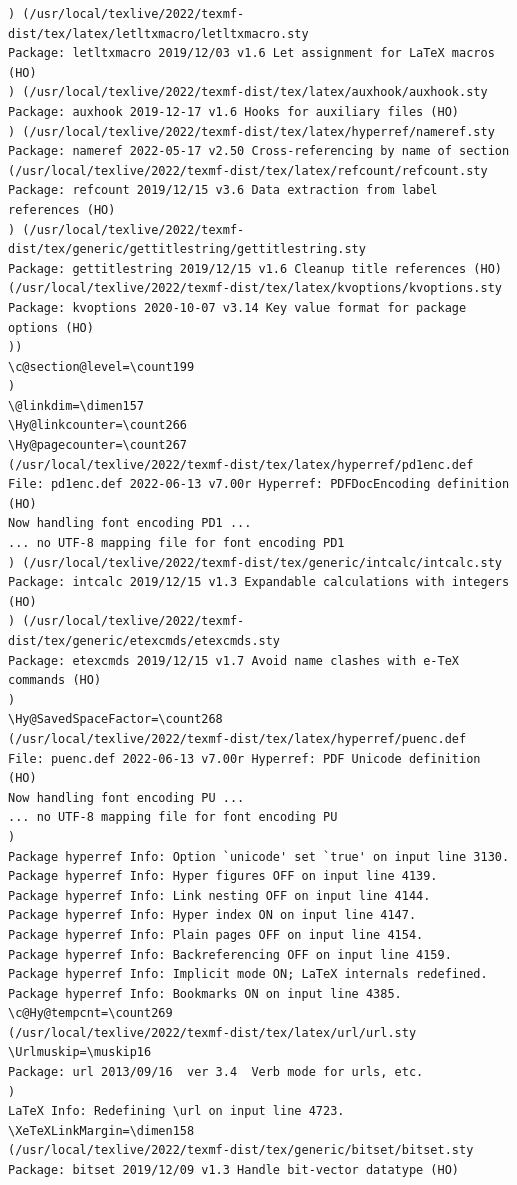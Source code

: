 \documentclass{article}
\begin{document}
\begin{verbatim}
) (/usr/local/texlive/2022/texmf-dist/tex/latex/letltxmacro/letltxmacro.sty
Package: letltxmacro 2019/12/03 v1.6 Let assignment for LaTeX macros (HO)
) (/usr/local/texlive/2022/texmf-dist/tex/latex/auxhook/auxhook.sty
Package: auxhook 2019-12-17 v1.6 Hooks for auxiliary files (HO)
) (/usr/local/texlive/2022/texmf-dist/tex/latex/hyperref/nameref.sty
Package: nameref 2022-05-17 v2.50 Cross-referencing by name of section
(/usr/local/texlive/2022/texmf-dist/tex/latex/refcount/refcount.sty
Package: refcount 2019/12/15 v3.6 Data extraction from label references (HO)
) (/usr/local/texlive/2022/texmf-dist/tex/generic/gettitlestring/gettitlestring.sty
Package: gettitlestring 2019/12/15 v1.6 Cleanup title references (HO)
(/usr/local/texlive/2022/texmf-dist/tex/latex/kvoptions/kvoptions.sty
Package: kvoptions 2020-10-07 v3.14 Key value format for package options (HO)
))
\c@section@level=\count199
)
\@linkdim=\dimen157
\Hy@linkcounter=\count266
\Hy@pagecounter=\count267
(/usr/local/texlive/2022/texmf-dist/tex/latex/hyperref/pd1enc.def
File: pd1enc.def 2022-06-13 v7.00r Hyperref: PDFDocEncoding definition (HO)
Now handling font encoding PD1 ...
... no UTF-8 mapping file for font encoding PD1
) (/usr/local/texlive/2022/texmf-dist/tex/generic/intcalc/intcalc.sty
Package: intcalc 2019/12/15 v1.3 Expandable calculations with integers (HO)
) (/usr/local/texlive/2022/texmf-dist/tex/generic/etexcmds/etexcmds.sty
Package: etexcmds 2019/12/15 v1.7 Avoid name clashes with e-TeX commands (HO)
)
\Hy@SavedSpaceFactor=\count268
(/usr/local/texlive/2022/texmf-dist/tex/latex/hyperref/puenc.def
File: puenc.def 2022-06-13 v7.00r Hyperref: PDF Unicode definition (HO)
Now handling font encoding PU ...
... no UTF-8 mapping file for font encoding PU
)
Package hyperref Info: Option `unicode' set `true' on input line 3130.
Package hyperref Info: Hyper figures OFF on input line 4139.
Package hyperref Info: Link nesting OFF on input line 4144.
Package hyperref Info: Hyper index ON on input line 4147.
Package hyperref Info: Plain pages OFF on input line 4154.
Package hyperref Info: Backreferencing OFF on input line 4159.
Package hyperref Info: Implicit mode ON; LaTeX internals redefined.
Package hyperref Info: Bookmarks ON on input line 4385.
\c@Hy@tempcnt=\count269
(/usr/local/texlive/2022/texmf-dist/tex/latex/url/url.sty
\Urlmuskip=\muskip16
Package: url 2013/09/16  ver 3.4  Verb mode for urls, etc.
)
LaTeX Info: Redefining \url on input line 4723.
\XeTeXLinkMargin=\dimen158
(/usr/local/texlive/2022/texmf-dist/tex/generic/bitset/bitset.sty
Package: bitset 2019/12/09 v1.3 Handle bit-vector datatype (HO)

\end{verbatim}
\end{document}
